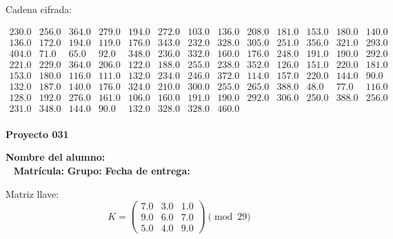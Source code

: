 \documentclass[12pt]{article}
\begin{document}
Cadena cifrada:
\begin{center}
$\begin{array}{lllllllllllll}
230.0 & 256.0 & 364.0 & 279.0 & 194.0 & 272.0 & 103.0 & 136.0 & 208.0 & 181.0 & 153.0 & 180.0 & 140.0\\
136.0 & 172.0 & 194.0 & 119.0 & 176.0 & 343.0 & 232.0 & 328.0 & 305.0 & 251.0 & 356.0 & 321.0 & 293.0\\
404.0 & 71.0 & 65.0 & 92.0 & 348.0 & 236.0 & 332.0 & 160.0 & 176.0 & 248.0 & 191.0 & 190.0 & 292.0\\
221.0 & 229.0 & 364.0 & 206.0 & 122.0 & 188.0 & 255.0 & 238.0 & 352.0 & 126.0 & 151.0 & 220.0 & 181.0\\
153.0 & 180.0 & 116.0 & 111.0 & 132.0 & 234.0 & 246.0 & 372.0 & 114.0 & 157.0 & 220.0 & 144.0 & 90.0\\
132.0 & 187.0 & 140.0 & 176.0 & 324.0 & 210.0 & 300.0 & 255.0 & 265.0 & 388.0 & 48.0 & 77.0 & 116.0\\
128.0 & 192.0 & 276.0 & 161.0 & 106.0 & 160.0 & 191.0 & 190.0 & 292.0 & 306.0 & 250.0 & 388.0 & 256.0\\
231.0 & 348.0 & 144.0 & 90.0 & 132.0 & 328.0 & 328.0 & 460.0\\
\end{array}$
\end{center}

\newpage


\textbf{Proyecto 031}

\textbf{Nombre del alumno:} \underline{\hspace{13cm}}\\\
\vspace{1cm}
\textbf{Matrícula:} \underline{\hspace{4cm}} \hspace{1cm}
\textbf{Grupo:} \underline{\hspace{2cm}}
\textbf{Fecha de entrega:} \underline{\hspace{2cm}}

\medskip

Matriz llave:
\[
K = \begin{pmatrix}
7.0 & 3.0 & 1.0\\
9.0 & 6.0 & 7.0\\
5.0 & 4.0 & 9.0
\end{pmatrix} \pmod{29}
\]
\end{document}
